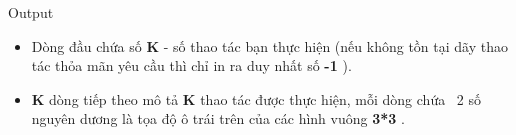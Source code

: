 Output   
\begin{itemize}
	\item     Dòng đầu chứa số    \textbf{     K    }    - số thao tác bạn thực hiện (nếu không tồn tại dãy thao tác thỏa mãn yêu cầu thì chỉ in ra duy nhất số    \textbf{     -1    }    ).   
	\item \textbf{     K    }    dòng tiếp theo mô tả    \textbf{     K    }    thao tác được thực hiện, mỗi dòng chứa  2 số nguyên dương là tọa độ ô trái trên của các hình vuông    \textbf{     3*3    }    .   
\end{itemize}